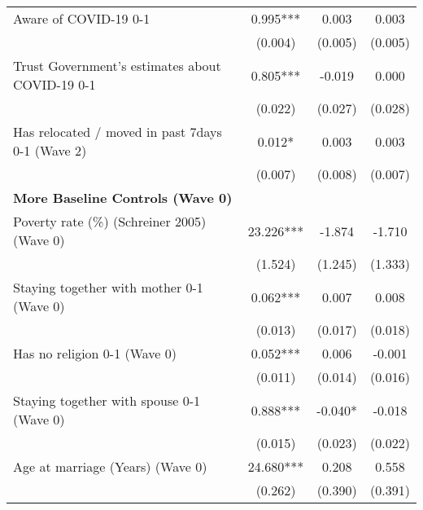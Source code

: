 \begin{tabular}{lccc}
 Aware of COVID-19 0-1 & 0.995*** & 0.003 & 0.003 \\ [0.1em] 
                   &      (0.004)     &      (0.005)     &      (0.005)     \\ [0.1em] 
 Trust Government's estimates about COVID-19 0-1 & 0.805*** & -0.019 & 0.000 \\ [0.1em] 
                   &      (0.022)     &      (0.027)     &      (0.028)     \\ [0.1em] 
 Has relocated / moved in past 7days 0-1 (Wave 2) & 0.012* & 0.003 & 0.003 \\ [0.1em] 
                   &      (0.007)     &      (0.008)     &      (0.007)     \\ [0.1em] 
\textbf{More Baseline Controls (Wave 0)} & & & \\ 
 Poverty rate (\%) (Schreiner 2005) (Wave 0) & 23.226*** & -1.874 & -1.710 \\ [0.1em] 
                   &      (1.524)     &      (1.245)     &      (1.333)     \\ [0.1em] 
 Staying together with mother 0-1 (Wave 0) & 0.062*** & 0.007 & 0.008 \\ [0.1em] 
                   &      (0.013)     &      (0.017)     &      (0.018)     \\ [0.1em] 
 Has no religion 0-1 (Wave 0) & 0.052*** & 0.006 & -0.001 \\ [0.1em] 
                   &      (0.011)     &      (0.014)     &      (0.016)     \\ [0.1em] 
 Staying together with spouse 0-1 (Wave 0) & 0.888*** & -0.040* & -0.018 \\ [0.1em] 
                   &      (0.015)     &      (0.023)     &      (0.022)     \\ [0.1em] 
 Age at marriage (Years) (Wave 0) & 24.680*** & 0.208 & 0.558 \\ [0.1em] 
                   &      (0.262)     &      (0.390)     &      (0.391)     \\ [0.1em] 
\hline\hline
\end{tabular}
